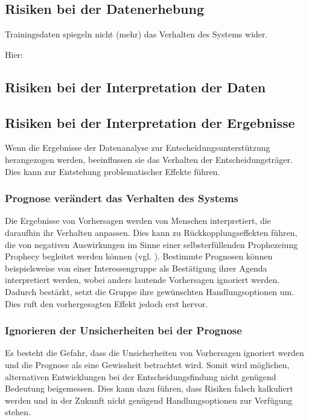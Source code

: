 \subsection{Risiken bei der Datenerhebung}

Trainingsdaten spiegeln nicht (mehr) das Verhalten des Systems wider.

Hier: \cite{Springer}

\subsection{Risiken bei der Interpretation der Daten}

\subsection{Risiken bei der Interpretation der Ergebnisse}

Wenn die Ergebnisse der Datenanalyse zur Entscheidungsunterstützung herangezogen
werden, beeinflussen sie das Verhalten der Entscheidungsträger. Dies kann zur
Entstehung problematischer Effekte führen.

\subsubsection{Prognose verändert das Verhalten des Systems }

Die Ergebnisse von Vorhersagen werden von Menschen interpretiert,
die daraufhin ihr Verhalten anpassen. Dies kann zu Rückkopplungseffekten führen,
die von negativen Auswirkungen im Sinne einer selbsterfüllenden Prophezeiung
 Prophecy\grqq{} begleitet werden können
(vgl. \cite{Crossman}). 
Bestimmte Prognosen können beispielsweise von einer 
Interessengruppe als Bestätigung ihrer Agenda interpretiert werden, wobei
anders lautende Vorhersagen ignoriert werden. Dadurch bestärkt, setzt die Gruppe
ihre gewünschten Handlungsoptionen um. Dies ruft den vorhergesagten Effekt
jedoch erst hervor.

\subsubsection{Ignorieren der Unsicherheiten bei der Prognose}

Es besteht die Gefahr, dass die Unsicherheiten von Vorhersagen ignoriert werden
und die Prognose als eine Gewissheit betrachtet wird. Somit wird möglichen,
alternativen Entwicklungen bei der Entscheidungsfindung nicht genügend Bedeutung
beigemessen. Dies kann dazu führen, dass Risiken falsch kalkuliert werden und
in der Zukunft nicht genügend Handlungsoptionen zur Verfügung stehen.

